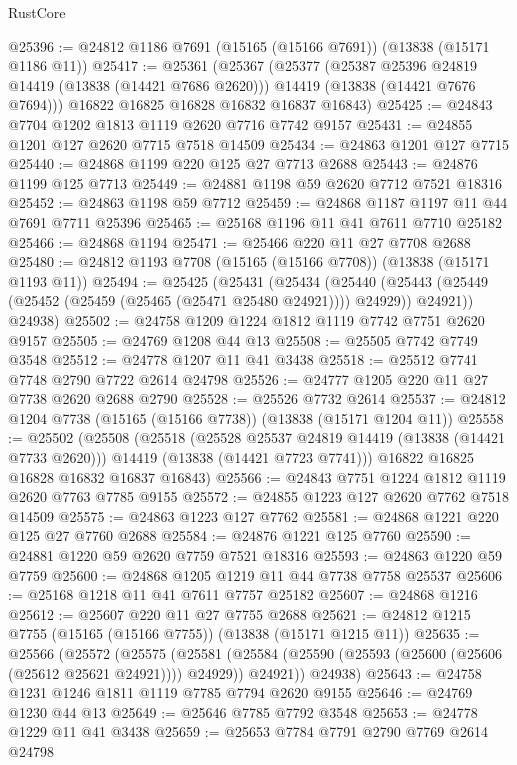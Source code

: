 \begin{lexlean}{RustCore}
\begin{coremodule}
@25396 := @24812 @1186 @7691 (@15165 (@15166 @7691)) (@13838 (@15171 @1186 @11))
@25417 := @25361
    (@25367
      (@25377
        (@25387 @25396 @24819 @14419 (@13838 (@14421 @7686 @2620)))
        @14419
        (@13838 (@14421 @7676 @7694)))
      @16822
      @16825
      @16828
      @16832
      @16837
      @16843)
@25425 := @24843 @7704 @1202 @1813 @1119 @2620 @7716 @7742 @9157
@25431 := @24855 @1201 @127 @2620 @7715 @7518 @14509
@25434 := @24863 @1201 @127 @7715
@25440 := @24868 @1199 @220 @125 @27 @7713 @2688
@25443 := @24876 @1199 @125 @7713
@25449 := @24881 @1198 @59 @2620 @7712 @7521 @18316
@25452 := @24863 @1198 @59 @7712
@25459 := @24868 @1187 @1197 @11 @44 @7691 @7711 @25396
@25465 := @25168 @1196 @11 @41 @7611 @7710 @25182
@25466 := @24868 @1194
@25471 := @25466 @220 @11 @27 @7708 @2688
@25480 := @24812 @1193 @7708 (@15165 (@15166 @7708)) (@13838 (@15171 @1193 @11))
@25494 := @25425
    (@25431
      (@25434
        (@25440 (@25443 (@25449 (@25452 (@25459 (@25465 (@25471 @25480 @24921)))) @24929)) @24921))
      @24938)
@25502 := @24758 @1209 @1224 @1812 @1119 @7742 @7751 @2620 @9157
@25505 := @24769 @1208 @44 @13
@25508 := @25505 @7742 @7749 @3548
@25512 := @24778 @1207 @11 @41 @3438
@25518 := @25512 @7741 @7748 @2790 @7722 @2614 @24798
@25526 := @24777 @1205 @220 @11 @27 @7738 @2620 @2688 @2790
@25528 := @25526 @7732 @2614
@25537 := @24812 @1204 @7738 (@15165 (@15166 @7738)) (@13838 (@15171 @1204 @11))
@25558 := @25502
    (@25508
      (@25518
        (@25528 @25537 @24819 @14419 (@13838 (@14421 @7733 @2620)))
        @14419
        (@13838 (@14421 @7723 @7741)))
      @16822
      @16825
      @16828
      @16832
      @16837
      @16843)
@25566 := @24843 @7751 @1224 @1812 @1119 @2620 @7763 @7785 @9155
@25572 := @24855 @1223 @127 @2620 @7762 @7518 @14509
@25575 := @24863 @1223 @127 @7762
@25581 := @24868 @1221 @220 @125 @27 @7760 @2688
@25584 := @24876 @1221 @125 @7760
@25590 := @24881 @1220 @59 @2620 @7759 @7521 @18316
@25593 := @24863 @1220 @59 @7759
@25600 := @24868 @1205 @1219 @11 @44 @7738 @7758 @25537
@25606 := @25168 @1218 @11 @41 @7611 @7757 @25182
@25607 := @24868 @1216
@25612 := @25607 @220 @11 @27 @7755 @2688
@25621 := @24812 @1215 @7755 (@15165 (@15166 @7755)) (@13838 (@15171 @1215 @11))
@25635 := @25566
    (@25572
      (@25575
        (@25581 (@25584 (@25590 (@25593 (@25600 (@25606 (@25612 @25621 @24921)))) @24929)) @24921))
      @24938)
@25643 := @24758 @1231 @1246 @1811 @1119 @7785 @7794 @2620 @9155
@25646 := @24769 @1230 @44 @13
@25649 := @25646 @7785 @7792 @3548
@25653 := @24778 @1229 @11 @41 @3438
@25659 := @25653 @7784 @7791 @2790 @7769 @2614 @24798

\end{coremodule}
\end{lexlean}
